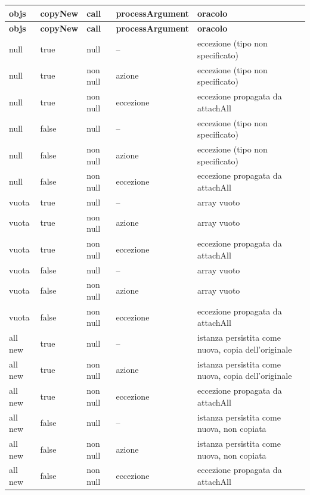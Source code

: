 {\footnotesize\setlength{\tabcolsep}{3pt}
\begin{longtable}{>{\raggedright\arraybackslash}p{}>{\raggedright\arraybackslash}p{}>{\raggedright\arraybackslash}p{}>{\raggedright\arraybackslash}p{}>{\raggedright\arraybackslash}p{}}
\toprule
\textbf{objs} & \textbf{copyNew} & \textbf{call} & \textbf{processArgument} & \textbf{oracolo} \\
\midrule
\endfirsthead
\toprule
\textbf{objs} & \textbf{copyNew} & \textbf{call} & \textbf{processArgument} & \textbf{oracolo} \\
\midrule
\endhead
\bottomrule
\endfoot
null & true & null & -- & eccezione (tipo non specificato) \\
null & true & non null & azione & eccezione (tipo non specificato) \\
null & true & non null & eccezione & eccezione propagata da attachAll \\
null & false & null & -- & eccezione (tipo non specificato) \\
null & false & non null & azione & eccezione (tipo non specificato) \\
null & false & non null & eccezione & eccezione propagata da attachAll \\
vuota & true & null & -- & array vuoto \\
vuota & true & non null & azione & array vuoto \\
vuota & true & non null & eccezione & eccezione propagata da attachAll \\
vuota & false & null & -- & array vuoto \\
vuota & false & non null & azione & array vuoto \\
vuota & false & non null & eccezione & eccezione propagata da attachAll \\
all new & true & null & -- & istanza persistita come nuova, copia dell'originale \\
all new & true & non null & azione & istanza persistita come nuova, copia dell'originale \\
all new & true & non null & eccezione & eccezione propagata da attachAll \\
all new & false & null & -- & istanza persistita come nuova, non copiata \\
all new & false & non null & azione & istanza persistita come nuova, non copiata \\
all new & false & non null & eccezione & eccezione propagata da attachAll \\

\end{longtable}}

